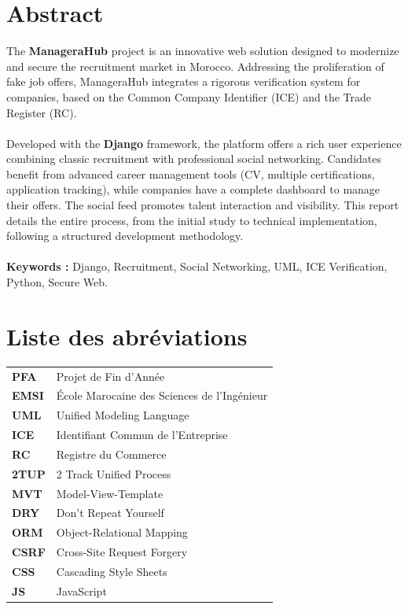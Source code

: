 \documentclass[12pt,a4paper]{report}
\begin{document}
\chapter*{Abstract}
The \textbf{ManageraHub} project is an innovative web solution designed to modernize and secure the recruitment market in Morocco. Addressing the proliferation of fake job offers, ManageraHub integrates a rigorous verification system for companies, based on the Common Company Identifier (ICE) and the Trade Register (RC). \\
\\
Developed with the \textbf{Django} framework, the platform offers a rich user experience combining classic recruitment with professional social networking. Candidates benefit from advanced career management tools (CV, multiple certifications, application tracking), while companies have a complete dashboard to manage their offers. The social feed promotes talent interaction and visibility. This report details the entire process, from the initial study to technical implementation, following a structured development methodology. \\
\\
\textbf{Keywords :} Django, Recruitment, Social Networking, UML, ICE Verification, Python, Secure Web.

\listoffigures
\listoftables

\chapter*{Liste des abréviations}
\begin{tabular}{ll}
    \textbf{PFA} & Projet de Fin d'Année \\
    \textbf{EMSI} & École Marocaine des Sciences de l'Ingénieur \\
    \textbf{UML} & Unified Modeling Language \\
    \textbf{ICE} & Identifiant Commun de l'Entreprise \\
    \textbf{RC} & Registre du Commerce \\
    \textbf{2TUP} & 2 Track Unified Process \\
    \textbf{MVT} & Model-View-Template \\
    \textbf{DRY} & Don't Repeat Yourself \\
    \textbf{ORM} & Object-Relational Mapping \\
    \textbf{CSRF} & Cross-Site Request Forgery \\
    \textbf{CSS} & Cascading Style Sheets \\
    \textbf{JS} & JavaScript \\
\end{tabular}
\end{document}
